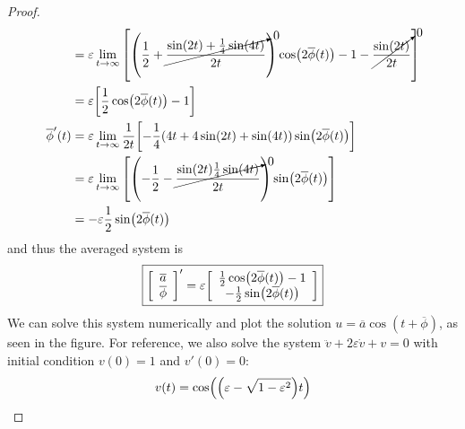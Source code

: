 \documentclass{article} %
\theoremstyle{plain}
\newcommand{\E}{\varepsilon}
\numberwithin{equation}{section} %
\numberwithin{figure}{section} %
\numberwithin{table}{section} %
\begin{document}
\begin{proof}
\begin{align*}
        &= \E\lim_{t\rightarrow \infty}\qty[\qty(\frac{1}{2} + \cancelto{0}{\frac{\sin(2t) + \frac{1}{4}\sin(4t)}{2t}})\cos(2\overline{\phi}(t)) - 1 - \cancelto{0}{\frac{\sin(2t)}{2t}}] \\
        &= \E\qty[\frac{1}{2}\cos(2\overline{\phi}(t)) - 1] \\
        \overline{\phi}'(t) &= \E\lim_{t\rightarrow \infty} \frac{1}{2t}\qty[-\frac{1}{4}\qty(4t + 4\sin(2t) + \sin(4t))\sin(2\overline{\phi}(t))] \\
        &= \E\lim_{t\rightarrow\infty}\qty[\qty(-\frac{1}{2} - \cancelto{0}{\frac{\sin(2t)\frac{1}{4}\sin(4t)}{2t}})\sin(2\overline{\phi}(t))] \\
        &= -\E\frac{1}{2}\sin(2\overline{\phi}(t))
    \end{align*}
    and thus the averaged system is
    \begin{align*}
        \boxed{\qty[\begin{array}{c}\overline{a} \\ \overline{\phi}\end{array}]' = \E\qty[\begin{array}{c}\frac{1}{2}\cos(2\overline{\phi}(t)) - 1 \\ -\frac{1}{2}\sin(2\overline{\phi}(t))\end{array}]}
    \end{align*}
    We can solve this system numerically and plot the solution $u = \overline{a}\cos(t + \overline{\phi})$, as seen in the figure.  For reference, we also solve the system $\ddot{v} + 2\E\dot{v} + v = 0$ with initial condition $v(0) = 1$ and $v'(0) = 0$:
    \begin{align*}
        v(t) = \cos(\qty(\E - \sqrt{1 - \E^2})t)
    \end{align*}
\end{proof}
\end{document}
